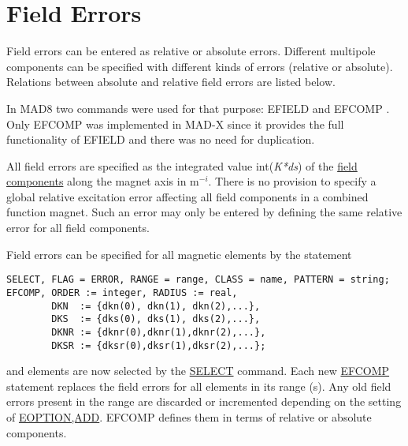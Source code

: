 
\section{Field Errors}
\label{sec:field_errors}
Field errors can be entered as relative or absolute errors. Different
multipole components can be specified with different kinds of errors
(relative or absolute). Relations between absolute and relative field
errors are listed below.  

In MAD8 two commands were used for that purpose: EFIELD \label{efield} and EFCOMP \label{efcomp}. Only
EFCOMP was implemented in MAD-X since it provides the full functionality
of EFIELD and there was no need for duplication.  

All field errors are specified as the integrated value
int(\textit{K*ds}) of the \href{../Introduction/sign_convent.html}{field
  components} along the magnet axis in m$^{-i}$. There is no provision
to specify a global relative excitation error affecting all field
components in a combined function magnet. Such an error may only be
entered by defining the same relative error for all field components.  

Field errors can be specified for all magnetic elements by the statement  

\begin{verbatim}
SELECT, FLAG = ERROR, RANGE = range, CLASS = name, PATTERN = string;
EFCOMP, ORDER := integer, RADIUS := real,
        DKN  := {dkn(0), dkn(1), dkn(2),...},
        DKS  := {dks(0), dks(1), dks(2),...},
        DKNR := {dknr(0),dknr(1),dknr(2),...},
        DKSR := {dksr(0),dksr(1),dksr(2),...};
\end{verbatim}
and elements are now selected by the
\href{../Introduction/select.html}{SELECT} command. Each new
\href{efcomp}{EFCOMP} statement replaces the field errors for all
elements in its range (s). Any old field errors present in the range are
discarded or incremented depending on the setting of
\href{error_option.html}{EOPTION,ADD}. EFCOMP defines them in terms of
relative or absolute components.  

